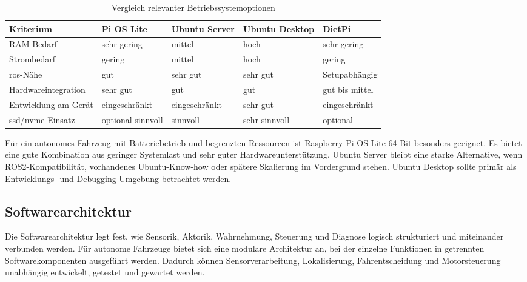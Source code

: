\begin{table}[h]
    \centering
    \caption{Vergleich relevanter Betriebssystemoptionen}
    \label{tab:os_vergleich}
    \begin{tabular}{lllll}
        \hline
        Kriterium                    & Pi OS Lite        & Ubuntu Server & Ubuntu Desktop & DietPi             \\
        \hline
        RAM-Bedarf                   & sehr gering       & mittel        & hoch           & sehr gering        \\
        Strombedarf                  & gering            & mittel        & hoch           & gering             \\
        \gls{ros}-Nähe               & gut               & sehr gut      & sehr gut       & Setupabhängig \\
        Hardwareintegration          & sehr gut          & gut           & gut            & gut bis mittel     \\
        Entwicklung am Gerät         & eingeschränkt     & eingeschränkt & sehr gut       & eingeschränkt      \\
        \gls{ssd}/\gls{nvme}-Einsatz & optional sinnvoll & sinnvoll      & sehr sinnvoll  & optional           \\
        \hline
    \end{tabular}
\end{table}

Für ein autonomes Fahrzeug mit Batteriebetrieb und begrenzten Ressourcen ist Raspberry Pi OS Lite 64 Bit besonders geeignet. Es bietet eine gute Kombination aus geringer Systemlast und sehr guter Hardwareunterstützung. Ubuntu Server bleibt eine starke Alternative, wenn ROS2-Kompatibilität, vorhandenes Ubuntu-Know-how oder spätere Skalierung im Vordergrund stehen. Ubuntu Desktop sollte primär als Entwicklungs- und Debugging-Umgebung betrachtet werden.

\subsection{Softwarearchitektur}
\label{sec:sw_architektur}

Die Softwarearchitektur legt fest, wie Sensorik, Aktorik, Wahrnehmung, Steuerung und Diagnose logisch strukturiert und miteinander verbunden werden. Für autonome Fahrzeuge bietet sich eine modulare Architektur an, bei der einzelne Funktionen in getrennten Softwarekomponenten ausgeführt werden. Dadurch können Sensorverarbeitung, Lokalisierung, Fahrentscheidung und Motorsteuerung unabhängig entwickelt, getestet und gewartet werden.


